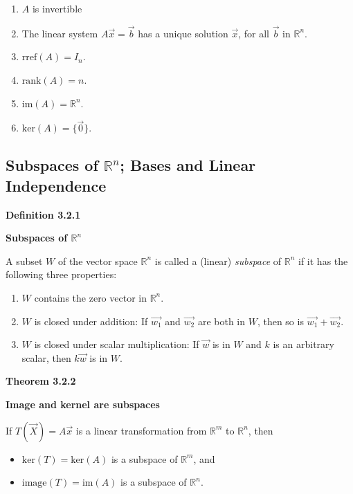 \renewcommand{\labelenumi}{\textbf{\roman{enumi}.}}
\begin{enumerate}
\item $A$ is invertible
\item The linear system $A\vec{x}=\vec{b}$ has a unique solution $\vec{x}$, for all $\vec{b}$ in $\mathbb{R}^{n}$.
\item $\textrm{rref}(A)=I_{n}$.
\item $\textrm{rank}(A)=n$.
\item $\textrm{im}(A)=\mathbb{R}^{n}$.
\item $\textrm{ker}(A)=\{\vec{0}\}$.
\end{enumerate}
\pagebreak

\subsection{Subspaces of \texorpdfstring{$\mathbb{R}^{n}$}{R^n}; Bases and Linear Independence}
\textbf{Definition 3.2.1}\\
\par\noindent\textbf{Subspaces of $\mathbb{R}^{n}$}
\par\noindent A subset $W$ of the vector space $\mathbb{R}^{n}$ is called a (linear) \textit{subspace} of $\mathbb{R}^{n}$ if it has the following three properties:
\renewcommand{\labelenumi}{\textbf{\alph{enumi}.}}
\begin{enumerate}
\item $W$ contains the zero vector in $\mathbb{R}^{n}$.
\item $W$ is closed under addition: If $\vec{w_{1}}$ and $\vec{w_{2}}$ are both in $W$, then so is $\vec{w_{1}}+\vec{w_{2}}$.
\item $W$ is closed under scalar multiplication: If $\vec{w}$ is in $W$ and $k$ is an arbitrary scalar, then $k\vec{w}$ is in $W$.
\end{enumerate}
\textbf{Theorem 3.2.2}\\
\par\noindent\textbf{Image and kernel are subspaces}
\par\noindent If $T(\vec{X})=A\vec{x}$ is a linear transformation from $\mathbb{R}^{m}$ to $\mathbb{R}^{n}$, then
\begin{itemize}
\item $\textrm{ker}(T)=\textrm{ker}(A)$ is a subspace of $\mathbb{R}^{m}$, and
\item $\textrm{image}(T)=\textrm{im}(A)$ is a subspace of $\mathbb{R}^{n}$.
\end{itemize}
